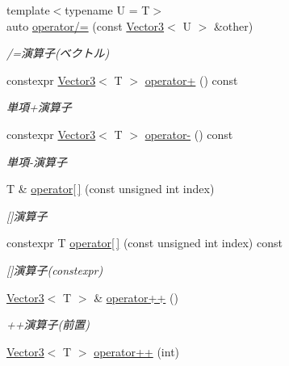 \begin{DoxyCompactItemize}
{\footnotesize template$<$typename U  = T$>$ }\\auto \mbox{\hyperlink{classsaki_1_1_vector3_a65eeb9e82784752ccde12b72a33da67e}{operator/=}} (const \mbox{\hyperlink{classsaki_1_1_vector3}{Vector3}}$<$ U $>$ \&other)
\begin{DoxyCompactList}\small\item\em /=演算子(ベクトル) \end{DoxyCompactList}\item 
constexpr \mbox{\hyperlink{classsaki_1_1_vector3}{Vector3}}$<$ T $>$ \mbox{\hyperlink{classsaki_1_1_vector3_a9aeb4f3478e477c4ffb6bc98fcc78574}{operator+}} () const
\begin{DoxyCompactList}\small\item\em 単項+演算子 \end{DoxyCompactList}\item 
constexpr \mbox{\hyperlink{classsaki_1_1_vector3}{Vector3}}$<$ T $>$ \mbox{\hyperlink{classsaki_1_1_vector3_ae030be03f3693adbec73a95f5c37ed18}{operator-\/}} () const
\begin{DoxyCompactList}\small\item\em 単項-\/演算子 \end{DoxyCompactList}\item 
T \& \mbox{\hyperlink{classsaki_1_1_vector3_ab473b7190d828bece80b0413588f6e32}{operator\mbox{[}$\,$\mbox{]}}} (const unsigned int index)
\begin{DoxyCompactList}\small\item\em \mbox{[}\mbox{]}演算子 \end{DoxyCompactList}\item 
constexpr T \mbox{\hyperlink{classsaki_1_1_vector3_a4b41b5e2569a245144e0b0b2c84470b6}{operator\mbox{[}$\,$\mbox{]}}} (const unsigned int index) const
\begin{DoxyCompactList}\small\item\em \mbox{[}\mbox{]}演算子(constexpr) \end{DoxyCompactList}\item 
\mbox{\hyperlink{classsaki_1_1_vector3}{Vector3}}$<$ T $>$ \& \mbox{\hyperlink{classsaki_1_1_vector3_a54f37380741717a26c25aba7645a909d}{operator++}} ()
\begin{DoxyCompactList}\small\item\em ++演算子(前置) \end{DoxyCompactList}\item 
\mbox{\hyperlink{classsaki_1_1_vector3}{Vector3}}$<$ T $>$ \mbox{\hyperlink{classsaki_1_1_vector3_a8ecd6192153cb65e169821917285fae0}{operator++}} (int)

\end{DoxyCompactItemize}
